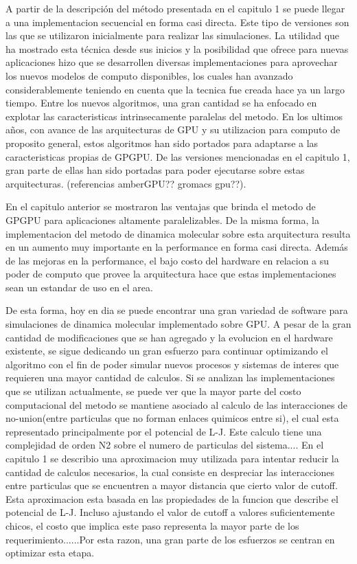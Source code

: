\documentclass[a4paper,10pt]{report}
\begin{document}


A partir de la descripción del método presentada en el capitulo 1 se puede llegar a una implementacion secuencial en forma casi directa. Este tipo de versiones son las que se utilizaron inicialmente para realizar las simulaciones.
La utilidad que ha mostrado esta técnica desde sus inicios y la posibilidad que ofrece para nuevas aplicaciones hizo que se desarrollen diversas implementaciones para aprovechar los nuevos modelos de computo disponibles, los cuales han avanzado considerablemente teniendo en cuenta que la tecnica fue creada hace ya un largo tiempo. 
Entre los nuevos algoritmos, una gran cantidad se ha enfocado en explotar las caracteristicas intrinsecamente paralelas del metodo. En los ultimos años, con avance de las arquitecturas de GPU y su utilizacion para computo de proposito general, estos algoritmos han sido portados para adaptarse a las caracteristicas propias de GPGPU.
De las versiones mencionadas en el capitulo 1, gran parte de ellas han sido portadas para poder ejecutarse sobre estas arquitecturas. (referencias amberGPU?? gromacs gpu??).

En el capitulo anterior se mostraron las ventajas que brinda el metodo de GPGPU para aplicaciones altamente paralelizables. De la misma forma,  la implementacion del metodo de dinamica molecular sobre esta arquitectura resulta en un aumento muy importante en la performance en forma casi directa. Además de las mejoras en la performance, el bajo costo del hardware en relacion a su poder de computo que provee la arquitectura hace que estas implementaciones sean un estandar de uso en el area.  

De esta forma, hoy en dia se puede encontrar una gran variedad de software para simulaciones de dinamica molecular implementado sobre GPU. A pesar de la gran cantidad de modificaciones que se han agregado y la evolucion en el hardware existente, se sigue dedicando un gran esfuerzo para continuar optimizando el algoritmo con el fin de poder simular nuevos procesos y sistemas de interes que requieren una mayor cantidad de calculos. 
Si se analizan las implementaciones que se utilizan actualmente, se puede ver que la mayor parte del costo computacional del metodo se mantiene asociado al calculo de las interacciones de no-union(entre particulas que no forman enlaces quimicos entre si), el cual esta representado principalmente por el potencial de L-J. Este calculo tiene una complejidad de orden N2 sobre el numero de particulas del sistema....
En el capitulo 1 se describio una aproximacion muy utilizada para intentar reducir la cantidad de calculos necesarios, la cual consiste en despreciar las interacciones entre particulas que se encuentren a mayor distancia que cierto valor de cutoff. Esta aproximacion esta basada en las propiedades de la funcion que describe el potencial de L-J. Incluso ajustando el valor de cutoff a valores suficientemente chicos, el costo que implica este paso representa la mayor parte de los requerimiento......Por esta razon, una gran parte de los esfuerzos se centran en optimizar esta etapa.
 
\end{document}

